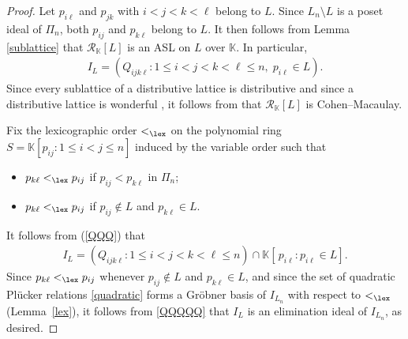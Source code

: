 \documentclass[12pt,a4paper]{amsart}
\def\Rc{{\mathcal R}}
\theoremstyle{definition}
\begin{document}
\begin{proof}
Let $p_{i \ell}$ and $p_{j k}$ with $i < j < k < \ell$ belong to $L$.  Since $L_n \setminus L$ is a poset ideal of $\Pi_n$, both $p_{ij}$ and $p_{k\ell}$ belong to $L$.  It then follows from Lemma \ref{sublattice}  that $\Rc_\mathbb{K}[L]$ is an ASL on $L$ over $\mathbb{K}$.  In particular,
\begin{eqnarray}
\label{QQQ}    
I_{L} = (Q_{ijk\ell} : 1\leq i<j<k<\ell \leq n, \; p_{i\ell} \in L).
\end{eqnarray}
Since every sublattice of a distributive lattice is distributive and since a distributive lattice is wonderful \cite[p.~263]{Eisenbud80}, it follows from \cite[Corollary 4.2]{Eisenbud80} that $\Rc_\mathbb{K}[L]$ is Cohen--Macaulay.

Fix the lexicographic order $<_{\lex}$ on the polynomial ring $S=\mathbb{K}[p_{ij} : 1 \leq i < j \leq n]$ induced by the variable order such that
\begin{itemize}
    \item[$(i)$] $p_{k\ell} <_{\lex} p_{ij}$ if $p_{ij} < p_{k \ell}$ in $\Pi_n$;
    \item[$(ii)$] $p_{k\ell} <_{\lex} p_{ij}$ if $p_{ij} \not\in L$ and $p_{k\ell} \in L$.
\end{itemize}
 It follows from (\ref{QQQ}) that  
\begin{eqnarray}
\label{QQQQQ}
I_{L} = (Q_{ijk\ell} : 1\leq i < j < k < \ell \leq n) \cap \mathbb{K}[\,p_{i\ell} : p_{i\ell} \in L].
\end{eqnarray}
Since \(p_{k\ell} <_{\lex} p_{ij}\) whenever \(p_{ij} \notin L\) and \(p_{k\ell} \in L\), and since the set of quadratic Plücker relations \eqref{quadratic} forms a Gröbner basis of \(I_{L_n}\) with respect to \(<_{\lex}\) (Lemma~\ref{lex}), it follows from \eqref{QQQQQ} that \(I_L\) is an elimination ideal of \(I_{L_n}\), as desired.
\end{proof}
\end{document}
